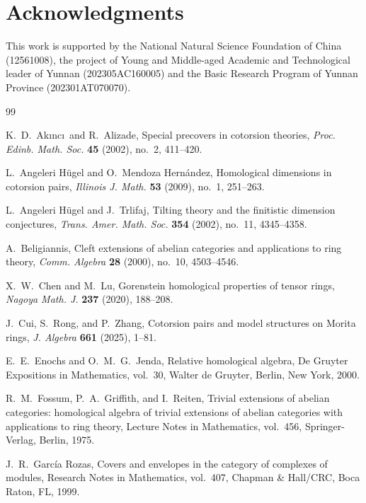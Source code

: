 \documentclass[11pt,reqno]{amsart}
\numberwithin{equation}{section}
\begin{document}
\section*{Acknowledgments}
This work is supported by
the National Natural Science Foundation of China (12561008),
the project of Young and Middle-aged Academic and Technological leader of Yunnan
(202305AC160005) and the Basic Research Program of Yunnan Province (202301AT070070).

\begin{thebibliography}{99}



K.~D.~Ak\i nc\i\ and R.~Alizade,
Special precovers in cotorsion theories,
\emph{Proc. Edinb. Math. Soc.} \textbf{45} (2002), no.~2, 411--420.

L.~Angeleri H\"ugel and O.~Mendoza Hern\'andez,
Homological dimensions in cotorsion pairs,
\emph{Illinois J. Math.} \textbf{53} (2009), no.~1, 251--263.

L.~Angeleri H\"ugel and J.~Trlifaj,
Tilting theory and the finitistic dimension conjectures,
\emph{Trans. Amer. Math. Soc.} \textbf{354} (2002), no.~11, 4345--4358.

A.~Beligiannis,
Cleft extensions of abelian categories and applications to ring theory,
\emph{Comm. Algebra} \textbf{28} (2000), no.~10, 4503--4546.

X.~W.~Chen and M.~Lu,
Gorenstein homological properties of tensor rings,
\emph{Nagoya Math. J.} \textbf{237} (2020), 188--208.

J.~Cui, S.~Rong, and P.~Zhang,
Cotorsion pairs and model structures on Morita rings,
\emph{J. Algebra} \textbf{661} (2025), 1--81.

E.~E.~Enochs and O.~M.~G.~Jenda,
{Relative homological algebra},
De Gruyter Expositions in Mathematics, vol.~30,
Walter de Gruyter, Berlin, New York, 2000.

R.~M.~Fossum, P.~A.~Griffith, and I.~Reiten,
{Trivial extensions of abelian categories: homological algebra of trivial extensions of abelian categories with applications to ring theory},
Lecture Notes in Mathematics, vol.~456,
Springer-Verlag, Berlin, 1975.

J.~R.~Garc\'ia Rozas,
{Covers and envelopes in the category of complexes of modules},
Research Notes in Mathematics, vol.~407,
Chapman \& Hall/CRC, Boca Raton, FL, 1999.


\end{thebibliography}
\end{document}
